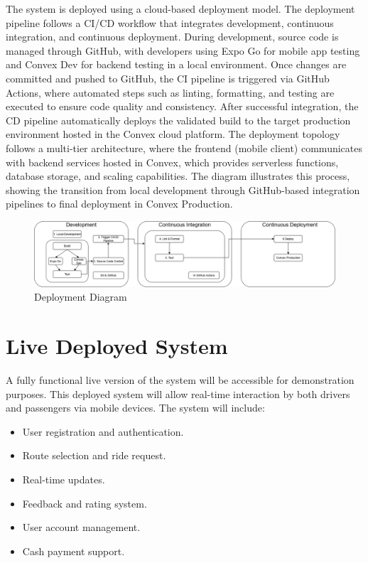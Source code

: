 \documentclass[12pt]{article}
\begin{document}
The system is deployed using a cloud-based deployment model. The deployment pipeline follows a CI/CD workflow that integrates development, continuous integration, and continuous deployment. During development, source code is managed through GitHub, with developers using Expo Go for mobile app testing and Convex Dev for backend testing in a local environment. Once changes are committed and pushed to GitHub, the CI pipeline is triggered via GitHub Actions, where automated steps such as linting, formatting, and testing are executed to ensure code quality and consistency. After successful integration, the CD pipeline automatically deploys the validated build to the target production environment hosted in the Convex cloud platform. The deployment topology follows a multi-tier architecture, where the frontend (mobile client) communicates with backend services hosted in Convex, which provides serverless functions, database storage, and scaling capabilities. The diagram illustrates this process, showing the transition from local development through GitHub-based integration pipelines to final deployment in Convex Production.

\begin{figure}[H]
  \centering
  \includegraphics[width=1\textwidth]{Deployment Model.png}
  \caption{Deployment Diagram}
\end{figure}

\section{Live Deployed System}
A fully functional live version of the system will be accessible for demonstration purposes. This deployed system will allow real-time interaction by both drivers and passengers via mobile devices. The system will include:
\begin{itemize}
    \item User registration and authentication.
    \item Route selection and ride request.
    \item Real-time updates.
    \item Feedback and rating system.
    \item User account management.
    \item Cash payment support.
\end{itemize}
\end{document}

